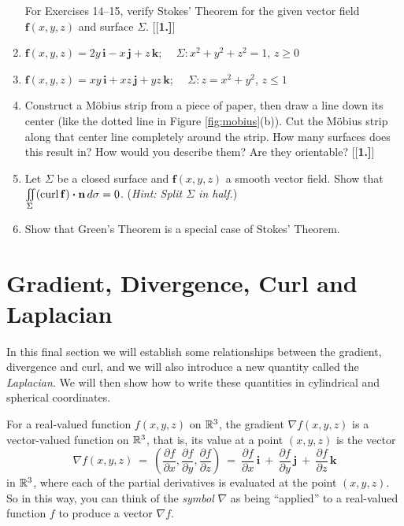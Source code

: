 \begin{enumerate}[\bfseries 1.]
\par\noindent For Exercises 14--15, verify Stokes' Theorem for the given vector field $\mathbf{f}(x,y,z)$ and
surface $\Sigma$.
[{[\bfseries 1.]}]
 \item $\mathbf{f}(x,y,z) = 2y\,\mathbf{i} - x\,\mathbf{j} + z\,\mathbf{k}$; $\quad \Sigma: x^2 + y^2 + z^2 = 1$,
  $z \ge 0$
 \item $\mathbf{f}(x,y,z) = xy\,\mathbf{i} + xz\,\mathbf{j} + yz\,\mathbf{k}$; $\quad \Sigma: z=x^2 + y^2$, $z \le 1$
\item Construct a M\"{o}bius strip from a piece of paper, then draw a line down its center (like the dotted line in
Figure \ref{fig:mobius}(b)). 
Cut the M\"{o}bius strip along that center line completely around the strip. 
How many surfaces does this result in? 
How would you describe them? 
Are they orientable?
[{[\bfseries 1.]}]
 \item Let $\Sigma$ be a closed surface and $\mathbf{f}(x,y,z)$ a smooth vector field. Show that\\
  $\iint\limits_{\Sigma} (\mathop{\mathrm{curl}}\nolimits\mathbf{f}) \bm{\cdot} \mathbf{n}\,d\sigma = 0$. (\emph{Hint: Split $\Sigma$
  in half.})
 \item Show that Green's Theorem is a special case of Stokes' Theorem.
\end{enumerate}
\newpage
\section{Gradient, Divergence, Curl and Laplacian}

In this final section we will establish some relationships between the gradient, divergence and curl, and we will
also introduce a new quantity called the \emph{Laplacian}. We will then show how to write these quantities in
cylindrical and spherical coordinates.

For a real-valued function $f(x,y,z)$ on $\mathbb{R}^{3}$, the gradient $\nabla f(x,y,z)$ is a vector-valued function on
$\mathbb{R}^{3}$, that is, its value at a point $(x,y,z)$ is the vector
\begin{displaymath}
 \nabla f(x,y,z) ~=~ \left( \frac{\partial f}{\partial x},\frac{\partial f}{\partial y},\frac{\partial f}{\partial z}
  \right) ~=~
 \frac{\partial f}{\partial x}\,\mathbf{i} ~+~ \frac{\partial f}{\partial y}\,\mathbf{j} ~+~
 \frac{\partial f}{\partial z}\,\mathbf{k}
\end{displaymath}
in $\mathbb{R}^{3}$, where each of the partial derivatives is evaluated at the point $(x,y,z)$. So in this way, you can think
of the \emph{symbol} $\nabla$ as being ``applied'' to a real-valued function $f$ to produce a vector $\nabla f$.

